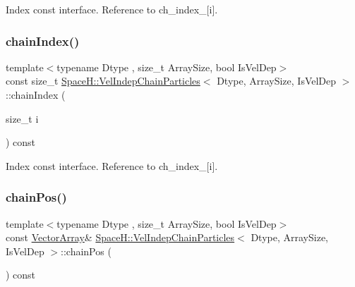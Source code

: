 Index const interface. Reference to ch\+\_\+index\+\_\+\mbox{[}i\mbox{]}. 

\mbox{\label{class_space_h_1_1_vel_indep_chain_particles_a99486efb9a38d5b097bcb35d46204dfd}} 
\subsubsection{\texorpdfstring{chain\+Index()}{chainIndex()}\hspace{0.1cm}{\footnotesize\ttfamily [4/4]}}
{\footnotesize\ttfamily template$<$typename Dtype , size\+\_\+t Array\+Size, bool Is\+Vel\+Dep$>$ \\
const size\+\_\+t \mbox{\hyperlink{class_space_h_1_1_vel_indep_chain_particles}{Space\+H\+::\+Vel\+Indep\+Chain\+Particles}}$<$ Dtype, Array\+Size, Is\+Vel\+Dep $>$\+::chain\+Index (\begin{DoxyParamCaption}\item[{size\+\_\+t}]{i }\end{DoxyParamCaption}) const\hspace{0.3cm}{\ttfamily [inline]}}



Index const interface. Reference to ch\+\_\+index\+\_\+\mbox{[}i\mbox{]}. 

\mbox{\label{class_space_h_1_1_vel_indep_chain_particles_a2dd7d2f703141d0ef3d8728b2a57cb83}} 
\subsubsection{\texorpdfstring{chain\+Pos()}{chainPos()}\hspace{0.1cm}{\footnotesize\ttfamily [1/4]}}
{\footnotesize\ttfamily template$<$typename Dtype , size\+\_\+t Array\+Size, bool Is\+Vel\+Dep$>$ \\
const \mbox{\hyperlink{class_space_h_1_1_vel_indep_particles_aa9983058940249df8b00fa800e8cbad2}{Vector\+Array}}\& \mbox{\hyperlink{class_space_h_1_1_vel_indep_chain_particles}{Space\+H\+::\+Vel\+Indep\+Chain\+Particles}}$<$ Dtype, Array\+Size, Is\+Vel\+Dep $>$\+::chain\+Pos (\begin{DoxyParamCaption}{ }\end{DoxyParamCaption}) const\hspace{0.3cm}{\ttfamily [inline]}}



